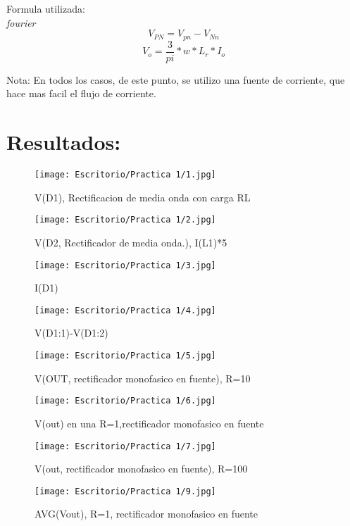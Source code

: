 \documentclass[11pt,a4paper]{article}
\begin{document}
\begin{enumerate}
Formula utilizada:\\
 \emph{fourier}
 $$ V_{PN}= V_{pn}- V_{Nn} $$
 $$ V_{o}= \frac{3}{pi}* w* L_{r}* I_{o} $$

Nota: En todos los casos, de este punto, se utilizo una fuente de corriente, que hace mas facil el flujo de corriente.

\end{enumerate}

\section{Resultados:}

\begin{figure}[hbtp]
\centering
\texttt{[image: Escritorio/Practica 1/1.jpg]}
\caption{V(D1), Rectificacion de media onda con carga RL}
\end{figure}


\begin{figure}[hbtp]
\centering
\texttt{[image: Escritorio/Practica 1/2.jpg]}
\caption{V(D2, Rectificador de media onda.), I(L1)*5}
\end{figure}


\begin{figure}[hbtp]
\centering
\texttt{[image: Escritorio/Practica 1/3.jpg]}
\caption{I(D1)}
\end{figure}

\begin{figure}[hbtp]
\centering
\texttt{[image: Escritorio/Practica 1/4.jpg]}
\caption{V(D1:1)-V(D1:2)}
\end{figure}


\begin{figure}[hbtp]
\centering
\texttt{[image: Escritorio/Practica 1/5.jpg]}
\caption{V(OUT, rectificador monofasico en fuente), R=10}
\end{figure}

\begin{figure}[hbtp]
\centering
\texttt{[image: Escritorio/Practica 1/6.jpg]}
\caption{V(out) en una R=1,rectificador monofasico en fuente}
\end{figure}


\begin{figure}[hbtp]
\centering
\texttt{[image: Escritorio/Practica 1/7.jpg]}
\caption{V(out, rectificador monofasico en fuente), R=100}
\end{figure}


\begin{figure}[hbtp]
\centering
\texttt{[image: Escritorio/Practica 1/9.jpg]}
\caption{AVG(Vout), R=1, rectificador monofasico en fuente}
\end{figure}
\end{document}
